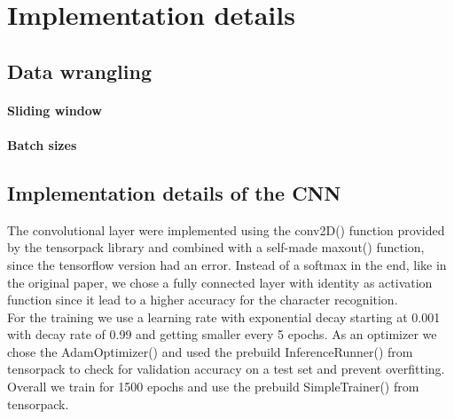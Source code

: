 \documentclass{utue} %
\begin{document}
\section{Implementation details}
\subsection{Data wrangling}
\paragraph{Sliding window}
\paragraph{Batch sizes}
\subsection{Implementation details of the CNN}
The convolutional layer were implemented using the conv2D() function provided by the tensorpack library and combined with a self-made maxout() function, since the tensorflow version had an error. Instead of a softmax in the end, like in the original paper, we chose a fully connected layer with identity as activation function since it lead to a higher accuracy for the character recognition. \\
For the training we use a learning rate with exponential decay starting at 0.001 with decay rate of 0.99 and getting smaller every 5 epochs. As an optimizer we chose the AdamOptimizer() and used the prebuild InferenceRunner() from tensorpack to check for validation accuracy on a test set and prevent overfitting. Overall we train for 1500 epochs and use the prebuild SimpleTrainer() from tensorpack. 
\end{document}
